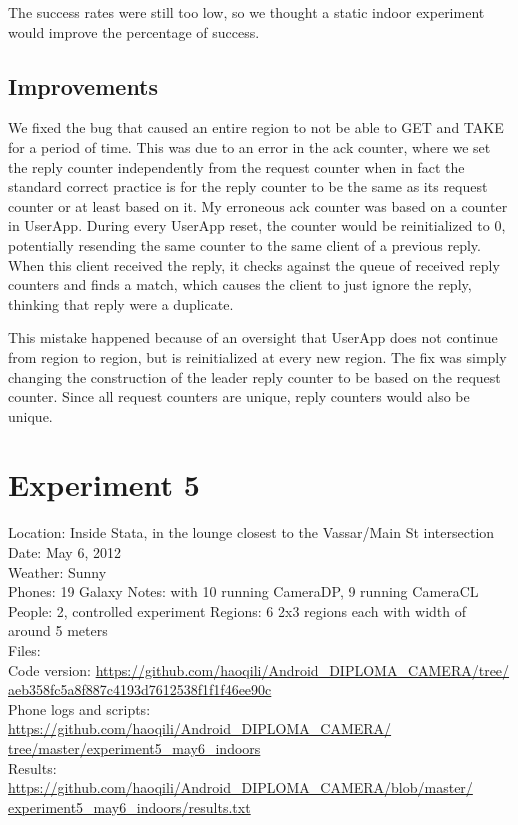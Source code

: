 The success rates were still too low, so we thought a static indoor experiment would improve the percentage of success.

\subsection{Improvements}

We fixed the bug that caused an entire region to not be able to GET and TAKE for a period of time. This was due to an error in the ack counter, where we set the reply counter independently from the request counter when in fact the standard correct practice is for the reply counter to be the same as its request counter or at least based on it. My erroneous ack counter was based on a counter in UserApp. During every UserApp reset, the counter would be reinitialized to 0, potentially resending the same counter to the same client of a previous reply. When this client received the reply, it checks against the queue of received reply counters and finds a match, which causes the client to just ignore the reply, thinking that reply were a duplicate.

This mistake happened because of an oversight that UserApp does not continue from region to region, but is reinitialized at every new region. The fix was simply changing the construction of the leader reply counter to be based on the request counter. Since all request counters are unique, reply counters would also be unique.

\section{Experiment 5}

Location: Inside Stata, in the lounge closest to the Vassar/Main St intersection\\
Date: May 6, 2012\\
Weather: Sunny\\
Phones: 19 Galaxy Notes: with 10 running CameraDP, 9 running CameraCL\\
People: 2, controlled experiment
Regions: 6 2x3 regions each with width of around 5 meters\\
Files:\\
Code version: {\url{https://github.com/haoqili/Android_DIPLOMA_CAMERA/tree/}}\\
{\url{aeb358fc5a8f887c4193d7612538f1f1f46ee90c}}\\
Phone logs and scripts: {\url{https://github.com/haoqili/Android_DIPLOMA_CAMERA/}}\\
{\url{tree/master/experiment5_may6_indoors}}\\ 
Results: {\url{https://github.com/haoqili/Android_DIPLOMA_CAMERA/blob/master/}}\\
{\url{experiment5_may6_indoors/results.txt}}\\

